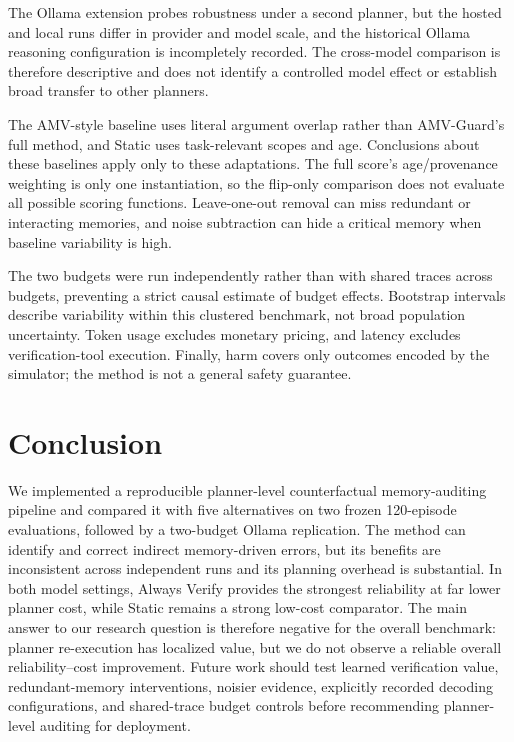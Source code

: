 \documentclass[11pt]{article}
\begin{document}
The Ollama extension probes robustness under a second planner, but the hosted and local runs differ in provider and model scale, and the historical Ollama reasoning configuration is incompletely recorded. The cross-model comparison is therefore descriptive and does not identify a controlled model effect or establish broad transfer to other planners.

The AMV-style baseline uses literal argument overlap rather than AMV-Guard's full method, and Static uses task-relevant scopes and age. Conclusions about these baselines apply only to these adaptations. The full score's age/provenance weighting is only one instantiation, so the flip-only comparison does not evaluate all possible scoring functions. Leave-one-out removal can miss redundant or interacting memories, and noise subtraction can hide a critical memory when baseline variability is high.

The two budgets were run independently rather than with shared traces across budgets, preventing a strict causal estimate of budget effects. Bootstrap intervals describe variability within this clustered benchmark, not broad population uncertainty. Token usage excludes monetary pricing, and latency excludes verification-tool execution. Finally, harm covers only outcomes encoded by the simulator; the method is not a general safety guarantee.

\section{Conclusion}

We implemented a reproducible planner-level counterfactual memory-auditing pipeline and compared it with five alternatives on two frozen 120-episode evaluations, followed by a two-budget Ollama replication. The method can identify and correct indirect memory-driven errors, but its benefits are inconsistent across independent runs and its planning overhead is substantial. In both model settings, Always Verify provides the strongest reliability at far lower planner cost, while Static remains a strong low-cost comparator. The main answer to our research question is therefore negative for the overall benchmark: planner re-execution has localized value, but we do not observe a reliable overall reliability--cost improvement. Future work should test learned verification value, redundant-memory interventions, noisier evidence, explicitly recorded decoding configurations, and shared-trace budget controls before recommending planner-level auditing for deployment.
\end{document}

